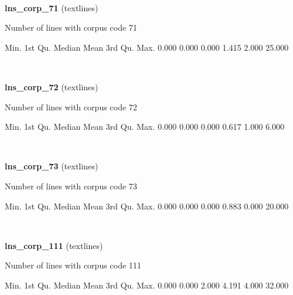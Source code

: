 \documentclass[]{article}
\newenvironment{Shaded}{\begin{snugshade}}{\end{snugshade}}
\newcommand{\FloatTok}[1]{\textcolor[rgb]{0.00,0.00,0.81}{{#1}}}
\newcommand{\NormalTok}[1]{{#1}}
\begin{document}
~

\vspace{1em}

\textbf{lns\_corp\_71} (textlines)

Number of lines with corpus code 71

\begin{Shaded}
\begin{Highlighting}[]
   \NormalTok{Min. 1st Qu.  Median    Mean 3rd Qu.    Max. }
  \FloatTok{0.000}   \FloatTok{0.000}   \FloatTok{0.000}   \FloatTok{1.415}   \FloatTok{2.000}  \FloatTok{25.000} 
\end{Highlighting}
\end{Shaded}

~

\vspace{1em}

\textbf{lns\_corp\_72} (textlines)

Number of lines with corpus code 72

\begin{Shaded}
\begin{Highlighting}[]
   \NormalTok{Min. 1st Qu.  Median    Mean 3rd Qu.    Max. }
  \FloatTok{0.000}   \FloatTok{0.000}   \FloatTok{0.000}   \FloatTok{0.617}   \FloatTok{1.000}   \FloatTok{6.000} 
\end{Highlighting}
\end{Shaded}

~

\vspace{1em}

\textbf{lns\_corp\_73} (textlines)

Number of lines with corpus code 73

\begin{Shaded}
\begin{Highlighting}[]
   \NormalTok{Min. 1st Qu.  Median    Mean 3rd Qu.    Max. }
  \FloatTok{0.000}   \FloatTok{0.000}   \FloatTok{0.000}   \FloatTok{0.883}   \FloatTok{0.000}  \FloatTok{20.000} 
\end{Highlighting}
\end{Shaded}

~

\vspace{1em}

\textbf{lns\_corp\_111} (textlines)

Number of lines with corpus code 111

\begin{Shaded}
\begin{Highlighting}[]
   \NormalTok{Min. 1st Qu.  Median    Mean 3rd Qu.    Max. }
  \FloatTok{0.000}   \FloatTok{0.000}   \FloatTok{2.000}   \FloatTok{4.191}   \FloatTok{4.000}  \FloatTok{32.000} 
\end{Highlighting}
\end{Shaded}
\end{document}
